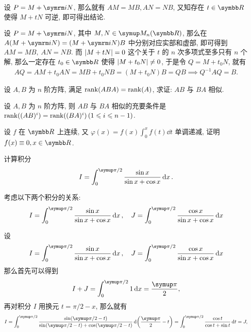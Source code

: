 \begin{exercise}[series=exer]
\begin{hint}
      设 $ P = M + \mi N $, 那么就有 $ AM = MB, AN = NB $, 又知存在 $ t \in \R $ 使得 $ M + tN $ 可逆, 即可得出结论.
  \end{hint}
  \begin{answer}
      设 $ P = M + \mi N $, 其中 $ M, N \in \MM $, 那么在 $ A(M + \mi N) = (M + \mi N)B $ 中分别对应实部和虚部, 即可得到 $ AM = MB,\ AN = NB $. 而 $ \abs{M + tN} = 0 $ 这个关于 $ t $ 的 $ n $ 次多项式至多只有 $ n $ 个解, 那么一定存在 $ t_{0} \in \R $ 使得 $ \abs{M + t_{0}N} \ne 0 $, 于是令 $ Q = M + t_{0}N $, 就有
      \begin{align*}
          AQ = AM + t_{0}AN = MB + t_{0}NB = (M + t_{0}N)B = QB \implies Q^{-1}AQ = B.
      \end{align*}
  \end{answer}
  \item 设 $ A, B $ 为 $ n $ 阶方阵, 满足 $ \rank(ABA) = \rank(A) $, 求证: $ AB $ 与 $ BA $ 相似.
  \item 设 $ A, B $ 为 $ n $ 阶方阵, 则 $ AB $ 与 $ BA $ 相似的充要条件是 $ \rank((AB)^{i}) = \rank((BA)^{i})\,(1 \leqslant i \leqslant n - 1) $.
  \item 设 $ f $ 在 $ \R $ 上连续, 又 $ \varphi(x) = f(x)\int_{0}^{x} f(t) \dd{t} $ 单调递减, 证明 $ f(x) \equiv 0, x\in\R $.
  \item 计算积分
  \begin{align*}
      I = \int_{0}^{\pi/2} \frac{\sin x}{\sin x + \cos x} \dx*.
  \end{align*}
  \begin{hint}
      考虑以下两个积分的关系:
      \begin{align*}
          I = \int_{0}^{\pi/2} \frac{\sin x}{\sin x + \cos x} \dx*, \quad J = \int_{0}^{\pi/2} \frac{\cos x}{\sin x + \cos x} \dx*
      \end{align*}
  \end{hint}
  \begin{answer}
      设
      \begin{align*}
          I = \int_{0}^{\pi/2} \frac{\sin x}{\sin x + \cos x} \dx*, \quad J = \int_{0}^{\pi/2} \frac{\cos x}{\sin x + \cos x} \dx*
      \end{align*}
      那么首先可以得到
      \begin{align*}
          I + J = \int_{0}^{\pi/2} 1\dx* = \frac{\pi}{2},
      \end{align*}
      再对积分 $ I $ 用换元 $ t = \pi/2 - x $, 那么就有
      \begin{align*}
          I = \int_{0}^{\pi/2} \frac{\sin(\pi/2 - t)}{\sin(\pi/2 - t) + \cos(\pi/2 - t)} \dd{\qty(\frac{\pi}{2} - t)} = \int_{0}^{\pi/2} \frac{\cos t}{\cos t + \sin t} \dd{t} = J,

\end{align*}
\end{answer}
\end{exercise}
